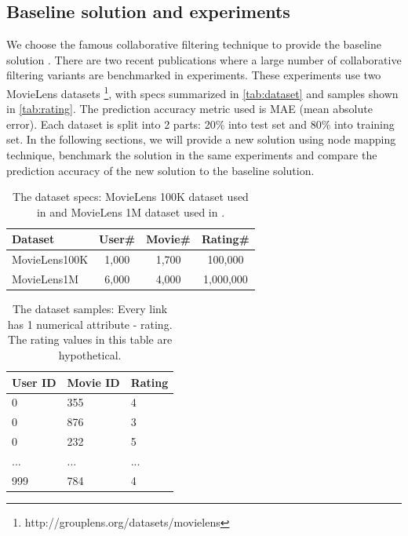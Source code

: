 \documentclass[twocolumn]{article}
\begin{document}
\subsection{Baseline solution and experiments}
We choose the famous collaborative filtering technique to provide the baseline 
solution \cite{polatidis2016multi}.
There are two recent publications where a large number of collaborative 
filtering variants are benchmarked \cite{hwang2016efficient} 
\cite{polatidis2016multi} in experiments.
These experiments use two MovieLens datasets \cite{harper2015movielens} 
\footnote{http://grouplens.org/datasets/movielens},
with specs summarized in \autoref{tab:dataset} and samples shown in 
\autoref{tab:rating}.
The prediction accuracy metric used is MAE (mean absolute error).
Each dataset is split into 2 parts: 20\% into test set and 80\% into training 
set.
In the following sections, we will provide a new solution using node mapping 
technique, benchmark the solution in the same experiments and compare the 
prediction accuracy of the new solution to the baseline solution.
\begin{table}[h]
	\centering
	\caption{The dataset specs: MovieLens 100K dataset used in 
	\cite{hwang2016efficient} and 
	MovieLens 1M dataset used in \cite{polatidis2016multi}.}
	\begin{tabularx}{0.5\textwidth}{ |X|c|c|c|}  \hline
		\textbf{Dataset} & \textbf{User\#} & \textbf{Movie\#} & 		
		\textbf{Rating\#} 
		\\ \hline
		MovieLens100K & 1,000 & 1,700 & 100,000 \\ \hline
		MovieLens1M & 6,000 & 4,000 & 1,000,000 \\ \hline
	\end{tabularx}
	\label{tab:dataset}
\end{table}
\begin{table}[h]
	\centering
	\caption{The dataset samples: Every link has 1 numerical attribute - 
		rating. The rating values in this table are hypothetical.}
	\begin{tabularx}{0.5\textwidth}{ |X|X|X| }  \hline
		\textbf{User ID} & \textbf{Movie ID} & \textbf{Rating} \\ \hline
		0 & 355 & 4 \\ \hline
		0 & 876 & 3 \\ \hline
		0 & 232 & 5 \\ \hline
		... & ... & ... \\ \hline
		999 & 784 & 4 \\ \hline
	\end{tabularx}
	\label{tab:rating}
\end{table}
\end{document}
